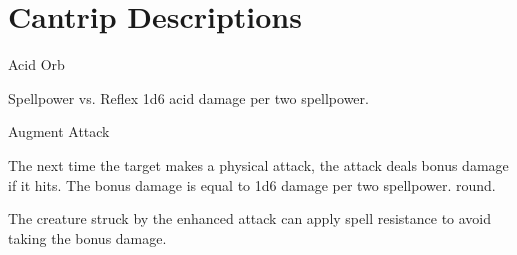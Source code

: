 \section{Cantrip Descriptions}

\begin{spellsection}{Acid Orb}
    \begin{spellheader}
    \end{spellheader}
    \begin{spellcontent}
        \begin{spelltargetinginfo}
        \end{spelltargetinginfo}
        \begin{spelleffects}
            \begin{spellattack}{Spellpower vs. Reflex}
                \spellsuccess 1d6 acid damage  per two spellpower.
            \end{spellattack}
        \end{spelleffects}
    \end{spellcontent}
    \begin{spellfooter}
        \physicalspellnotes
    \end{spellfooter}
\end{spellsection}

\begin{spellsection}{Augment Attack}
    \begin{spellheader}
    \end{spellheader}
    \begin{spellcontent}
        \begin{spelltargetinginfo}
        \end{spelltargetinginfo}
        \begin{spelleffects}
            \spelleffect The next time the target makes a physical attack, the attack deals bonus damage if it hits.
            The bonus damage is equal to 1d6 damage  per two spellpower.
             round.
        \end{spelleffects}
    \end{spellcontent}
    \begin{spellfooter}
        \spellnotes The creature struck by the enhanced attack can apply spell resistance to avoid taking the bonus damage.
    \end{spellfooter}
\end{spellsection}

